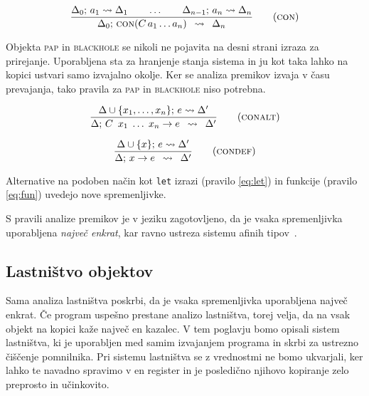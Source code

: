 \begin{equation}
\infers[con]{
    \Delta_0; \, a_1 \leadsto \Delta_1
    \qquad
    \dots
    \qquad
    \Delta_{n - 1}; \, a_n \leadsto \Delta_n
}{
    \Delta_0; \, \textsc{con}(C \, a_1 \dots a_n)
}{
	\Delta_n
}
\label{eq:con}
\end{equation}

Objekta \textsc{pap} in \textsc{blackhole} se nikoli ne pojavita na desni strani izraza za prirejanje. Uporabljena sta za hranjenje stanja sistema in ju kot taka lahko na kopici ustvari samo izvajalno okolje. Ker se analiza premikov izvaja v času prevajanja, tako pravila za \textsc{pap} in \textsc{blackhole} niso potrebna.

\begin{equation}
\infers[conalt]{
    \Delta \cup \{ x_1, \dots, x_n \}; \, e \leadsto \Delta'
}{
    \Delta; \, C \enspace x_1 \; \dots \; x_n \to e
}{
	\Delta'
}
\label{eq:conalt}
\end{equation}

\begin{equation}
\infers[condef]{
    \Delta \cup \{ x \}; \, e \leadsto \Delta'
}{
    \Delta; \, x \to e
}{
	\Delta'
}
\label{eq:conalt}
\end{equation}

Alternative na podoben način kot \texttt{let} izrazi (pravilo \ref{eq:let}) in funkcije (pravilo \ref{eq:fun}) uvedejo nove spremenljivke.

S pravili analize premikov je v jeziku zagotovljeno, da je vsaka spremenljivka uporabljena \emph{največ enkrat}, kar ravno ustreza sistemu afinih tipov~\cite{pierce2004advanced}.

\subsection{Lastništvo objektov}

Sama analiza lastništva poskrbi, da je vsaka spremenljivka uporabljena naj\-več enkrat. Če program uspešno prestane analizo lastništva, torej velja, da na vsak objekt na kopici kaže naj\-več en kazalec. V tem poglavju bomo opisali sistem lastništva, ki je uporabljen med samim izvajanjem programa in skrbi za ustrezno čiščenje pomnilnika. Pri sistemu lastništva se z  vrednostmi ne bomo ukvarjali, ker lahko te navadno spravimo v en register in je posledično njihovo kopiranje zelo preprosto in učinkovito.

